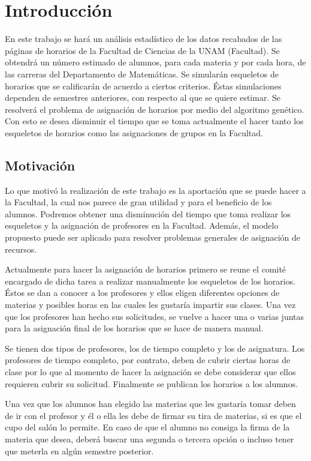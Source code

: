\chapter{Introducción}

En este trabajo se hará un análisis estadístico de los datos recabados de las páginas de horarios de la Facultad de Ciencias de la UNAM (Facultad). Se obtendrá un número estimado de alumnos, para cada materia y por cada hora, de las carreras del Departamento de Matemáticas. Se simularán esqueletos de horarios que se calificarán de acuerdo a ciertos criterios. Éstas simulaciones dependen de semestres anteriores, con respecto al que se quiere estimar. Se resolverá el problema de asignación de horarios por medio del algoritmo genético. Con esto se desea disminuir el tiempo que se toma actualmente el hacer tanto los esqueletos de horarios como las asignaciones de grupos en la Facultad.

\section{Motivación}

Lo que motivó la realización de este trabajo es la aportación que se puede hacer a la Facultad, la cual nos parece de gran utilidad y para el beneficio de los alumnos. Podremos obtener una disminución del tiempo que toma realizar los esqueletos y la asignación de profesores en la Facultad. Además, el modelo propuesto puede ser aplicado para resolver problemas generales de asignación de recursos.

Actualmente para hacer la asignación de horarios primero se reune el comité encargado de dicha tarea a realizar manualmente los esqueletos de los horarios. Éstos se dan a conocer a los profesores y ellos eligen diferentes opciones de materias y posibles horas en las cuales les gustaría impartir sus clases. Una vez que los profesores han hecho sus solicitudes, se vuelve a hacer una o varias juntas para la asignación final de los horarios que se hace de manera manual.

Se tienen dos tipos de profesores, los de tiempo completo y los de asignatura. Los profesores de tiempo completo, por contrato, deben de cubrir ciertas horas de clase por lo que al momento de hacer la asignación se debe considerar que ellos requieren cubrir su solicitud. Finalmente se publican los horarios a los alumnos.

Una vez que los alumnos han elegido las materias que les gustaría tomar deben de ir con el profesor y él o ella les debe de firmar su tira de materias, si es que el cupo del salón lo permite. En caso de que el alumno no consiga la firma de la materia que desea, deberá buscar una segunda o tercera opción o incluso tener que meterla en algún semestre posterior.

